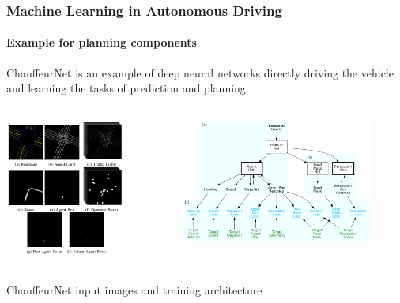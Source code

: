 \begin{frame}
\frametitle{Machine Learning in Autonomous Driving}
\framesubtitle{Example for planning components}
ChauffeurNet is an example of deep neural networks directly driving the vehicle
and learning the tasks of prediction and planning.\\
\begin{columns}[T]
    \begin{column}{0.4\textwidth}
        \centering
        \includegraphics[width=0.75\textwidth]{images/waymo_chauffeurnet_inputs.png}\\
    \end{column}
    \begin{column}{0.6\textwidth}
        \centering
        \includegraphics[width=0.85\textwidth]{images/waymo_chauffeurnet_network.png}\\
    \end{column}
\end{columns}
\vspace{0.2cm}
\centering
\footnotesize{ChauffeurNet input images and training architecture \cite{Bansal2019}}
\end{frame}

